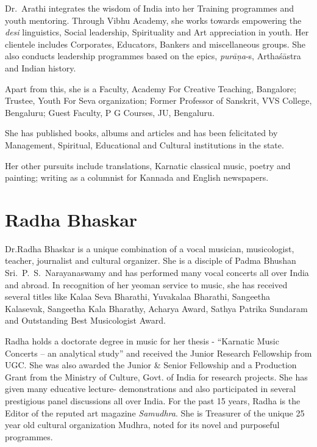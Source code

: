 Dr.~Arathi integrates the wisdom of India into her Training progra\-mmes and youth mentoring. Through Vibhu Academy, she works towards empowering the \textit{desi} linguistics, Social leadership, Spirituality and Art appreciation in youth. Her clientele includes Corporates, Educators, Bankers and miscellaneous groups. She also conducts leadership programmes based on the epics, \textit{purāṇa}-s, Arthaśāstra and Indian history.

Apart from this, she is a Faculty, Academy For Creative Teaching, Bangalore; Trustee, Youth For Seva organization; Former Professor of Sanskrit, VVS College, Bengaluru; Guest Faculty, P G Courses, JU, Bengaluru.

She has published books, albums and articles and has been felicitated by Management, Spiritual, Educational and Cultural institutions in the state.

Her other pursuits include translations, Karnatic classical music, poetry and painting; writing as a columnist for Kannada and English newspapers.

\vspace{-.5cm}

\section*{Radha Bhaskar}

\vspace{-.2cm}

Dr.Radha Bhaskar is a unique combination of a vocal musician, musicologist, teacher, journalist and cultural organizer. She is a disciple of Padma Bhushan Sri.~P.~S.~Narayanaswamy and has performed many vocal concerts all over India and abroad. In recognition of her yeoman service to music, she has received several titles like Kalaa Seva Bharathi, Yuvakalaa Bharathi, Sangeetha Kalasevak, Sangeetha Kala Bharathy, Acharya Award, Sathya Patrika Sundaram and Outstanding Best Musicologist Award.

Radha holds a doctorate degree in music for her thesis - “Karnatic Music Concerts – an analytical study” and received the Junior Research Fellowship from UGC. She was also awarded the Junior \& Senior Fellowship and a Production Grant from the Ministry of Culture, Govt. of India for research projects. She has given many educative lecture- demonstrations and also participated in several prestigious panel discussions all over India. For the past 15 years, Radha is the Editor of the reputed art magazine \textit{Samudhra}. She is Treasurer of the unique 25 year old cultural organization Mudhra, noted for its novel and purposeful programmes.

